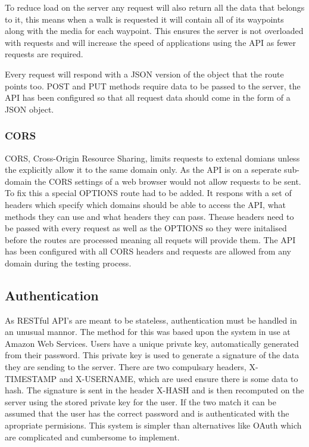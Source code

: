 \documentclass[11pt,a4paper]{article}
\begin{document}
To reduce load on the server any request will also return all the data that belongs to it, this means when a walk is requested it will contain all of its waypoints along with the media for each waypoint. This ensures the server is not overloaded with requests and will increase the speed of applications using the API as fewer requests are required.

Every request will respond with a JSON version of the object that the route points too. POST and PUT methods require data to be passed to the server, the API has been configured so that all request data should come in the form of a JSON object. 

\subsubsection{CORS}
CORS, Cross-Origin Resource Sharing, limits requests to extenal domians unless the explicitly allow it to the same domain only. As the API is on a seperate sub-domain the CORS settings of a web browser would not allow requests to be sent. To fix this a special OPTIONS route had to be added. It respons with a set of headers which specify which domains should be able to access the API, what methods they can use and what headers they can pass. Thease headers need to be passed with every request as well as the OPTIONS so they were initalised before the routes are processed meaning all requets will provide them. The API has been configured with all CORS headers and requests are allowed from any domain during the testing process. 

\subsection{Authentication}

As RESTful API's are meant to be stateless, authentication must be handled in an unusual mannor. The method for this was based upon the system in use at Amazon Web Services\cite{auth}. Users have a unique private key, automatically generated from their password. This private key is used to generate a signature of the data they are sending to the server. There are two compulsary headers, X-TIMESTAMP and X-USERNAME, which are used ensure there is some data to hash. The signature is sent in the header X-HASH and is then recomputed on the server using the stored private key for the user. If the two match it can be assumed that the user has the correct password and is authenticated with the apropriate permisions. This system is simpler than alternatives like OAuth which are complicated and cumbersome to implement. 
\end{document}
